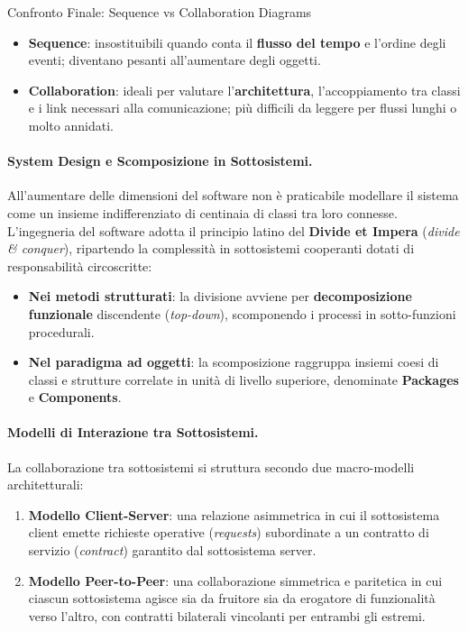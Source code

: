 \documentclass[12pt]{extarticle}
\begin{document}
\begin{cbox}{Confronto Finale: Sequence vs Collaboration Diagrams}
\begin{itemize}
    \item \textbf{Sequence}: insostituibili quando conta il \textbf{flusso del tempo} e l'ordine degli eventi; diventano pesanti all'aumentare degli oggetti.
    \item \textbf{Collaboration}: ideali per valutare l'\textbf{architettura}, l'accoppiamento tra classi e i link necessari alla comunicazione; più difficili da leggere per flussi lunghi o molto annidati.
\end{itemize}
\end{cbox}

\paragraph{System Design e Scomposizione in Sottosistemi.}
All'aumentare delle dimensioni del software non è praticabile modellare il sistema come un insieme indifferenziato di centinaia di classi tra loro connesse. L'ingegneria del software adotta il principio latino del \textbf{Divide et Impera} (\textit{divide \& conquer}), ripartendo la complessità in sottosistemi cooperanti dotati di responsabilità circoscritte:
\begin{itemize}
    \item \textbf{Nei metodi strutturati}: la divisione avviene per \textbf{decomposizione funzionale} discendente (\textit{top-down}), scomponendo i processi in sotto-funzioni procedurali.
    \item \textbf{Nel paradigma ad oggetti}: la scomposizione raggruppa insiemi coesi di classi e strutture correlate in unità di livello superiore, denominate \textbf{Packages} e \textbf{Components}.
\end{itemize}

\paragraph{Modelli di Interazione tra Sottosistemi.}
La collaborazione tra sottosistemi si struttura secondo due macro-modelli architetturali:
\begin{enumerate}
    \item \textbf{Modello Client-Server}: una relazione asimmetrica in cui il sottosistema client emette richieste operative (\textit{requests}) subordinate a un contratto di servizio (\textit{contract}) garantito dal sottosistema server.
    \item \textbf{Modello Peer-to-Peer}: una collaborazione simmetrica e paritetica in cui ciascun sottosistema agisce sia da fruitore sia da erogatore di funzionalità verso l'altro, con contratti bilaterali vincolanti per entrambi gli estremi.
\end{enumerate}
\end{document}
